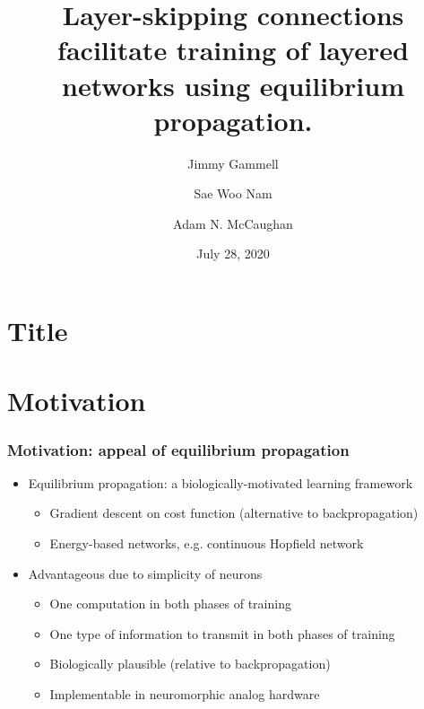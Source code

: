\documentclass[pdf]{beamer}
\title{Layer-skipping connections facilitate training of layered networks using equilibrium propagation.}
\author{Jimmy Gammell \and Sae Woo Nam \and Adam N. McCaughan}
\date{July 28, 2020}
\begin{document}
\section{Title} %
\begin{frame} %
	\titlepage
\end{frame}

\section{Motivation} %
\begin{frame}
	\frametitle{Motivation: appeal of equilibrium propagation}
	\begin{itemize}
		\item<1-> Equilibrium propagation\autocite{scellier17}: a biologically-motivated learning framework
		\begin{itemize}
			\item<2-> Gradient descent on cost function (alternative to backpropagation)
			\item<3-> Energy-based networks, e.g. continuous Hopfield network
		\end{itemize}
		\item<4-> Advantageous due to simplicity of neurons
		\begin{itemize}
			\item<5-> One computation in both phases of training
			\item<6-> One type of information to transmit in both phases of training
			\item<7-> Biologically plausible (relative to backpropagation)
			\item<8-> Implementable in neuromorphic analog hardware
		\end{itemize}
	\end{itemize}
\end{frame}
\end{document}
